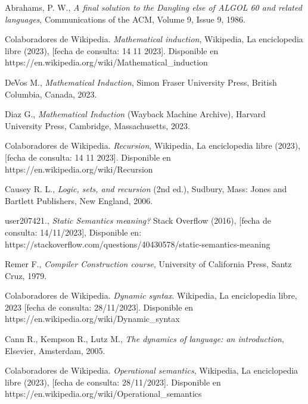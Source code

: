 \begin{thebibliography}{11}
     \bibitem{}
     \label{sec:90}
     \hypertarget{90}{}
     Abrahams, P. W., \textit{A final solution to the Dangling else of ALGOL 60 and related languages}, Communications of the ACM, Volume 9, Issue 9, 1986.%

    \bibitem{}
    \label{sec:91}
    \hypertarget{91}{}
    Colaboradores de Wikipedia. \textit{Mathematical induction}, Wikipedia, La enciclopedia libre (2023), [fecha de consulta: 14 11 2023]. Disponible en https://en.wikipedia.org/wiki/Mathematical\_induction

    \bibitem{}
    \label{sec:92}
    \hypertarget{92}{}
    DeVos M., \textit{Mathematical Induction}, Simon Fraser University Press, British Columbia, Canada, 2023.

    \bibitem{}
    \label{sec:93}
    \hypertarget{93}{}
    Diaz G., \textit{Mathematical Induction} (Wayback Machine Archive), Harvard University Press, Cambridge, Massachusetts, 2023. 

    \bibitem{}
    \label{sec:94}
    \hypertarget{94}{}
    Colaboradores de Wikipedia. \textit{Recursion}, Wikipedia, La enciclopedia libre (2023), [fecha de consulta: 14 11 2023]. Disponible en https://en.wikipedia.org/wiki/Recursion

    \bibitem{}
    \label{sec:95}
    \hypertarget{95}{}
    Causey R. L., \textit{Logic, sets, and recursion} (2nd ed.), Sudbury, Mass: Jones and Bartlett Publishers, New England, 2006.

    \bibitem{}
    \label{sec:96}
    \hypertarget{96}{}
    user207421., \textit{Static Semantics meaning?} Stack Overflow (2016), [fecha de consulta: 14/11/2023], Disponible en: https://stackoverflow.com/questions/40430578/static-semantics-meaning

    \bibitem{}
    \label{sec:97}
    \hypertarget{97}{}
    Remer F., \textit{Compiler Construction course}, University of California Press, Santz Cruz, 1979.

    \bibitem{}
    \label{sec:98}
    \hypertarget{98}{}
    Colaboradores de Wikipedia. \textit{Dynamic syntax}. Wikipedia, La enciclopedia libre, 2023 [fecha de consulta: 28/11/2023]. Disponible en https://en.wikipedia.org/wiki/Dynamic\_syntax

    \bibitem{}
    \label{sec:99}
    \hypertarget{99}{}
    Cann R., Kempson R., Lutz M., \textit{The dynamics of language: an introduction}, Elsevier, Amsterdam, 2005.

    \bibitem{}
    \label{sec:100}
    \hypertarget{100}{}
    Colaboradores de Wikipedia. \textit{Operational semantics}, Wikipedia, La enciclopedia libre (2023), [fecha de consulta: 28/11/2023]. Disponible en https://en.wikipedia.org/wiki/Operational\_semantics


\end{thebibliography}
